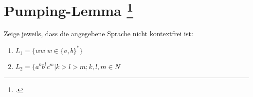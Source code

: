 \documentclass{lehramt-informatik-aufgabe}
\begin{document}
\section{Pumping-Lemma
\footcite{theo:ab:2}}

Zeige jeweils, dass die angegebene Sprache nicht kontextfrei ist:
\begin{enumerate}


\item $L_1 = \{ ww | w \in \{ a, b \}^* \}$


\item $L_2 = \{ a^k b^l c^m | k > l > m; k, l, m \in N$
\end{enumerate}
\end{document}
